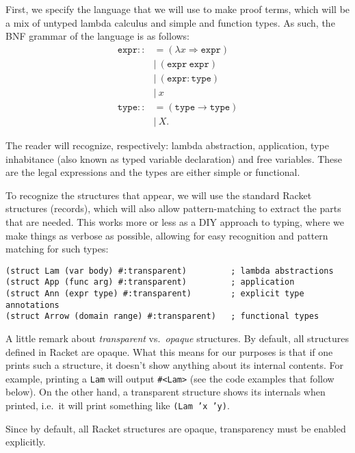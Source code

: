 First, we specify the language that we will use to make proof terms,
which will be a mix of untyped lambda calculus and simple and function
types. As such, the BNF grammar of the language is as follows:
\begin{align*}
  \texttt{expr} ::&= (\lambda x \Rightarrow \texttt{expr}) \\
                  &| \ (\texttt{expr} \ \texttt{expr}) \\
                  &| \ (\texttt{expr} : \texttt{type}) \\
                  &| \ x \\
  \texttt{type} ::&= (\texttt{type} \to \texttt{type}) \\
                  &| \ X.
\end{align*}

The reader will recognize, respectively: lambda abstraction, application,
type inhabitance (also known as typed variable declaration) and
free variables. These are the legal expressions and the types are
either simple or functional.

To recognize the structures that appear, we will use the standard
Racket structures (records), which will also allow pattern-matching to
extract the parts that are needed. This works more or less as a DIY
approach to typing, where we make things as verbose as possible, allowing
for easy recognition and pattern matching for such types:
{
  \small
\begin{verbatim}
(struct Lam (var body) #:transparent)         ; lambda abstractions
(struct App (func arg) #:transparent)         ; application
(struct Ann (expr type) #:transparent)        ; explicit type annotations
(struct Arrow (domain range) #:transparent)   ; functional types
\end{verbatim}
}

A little remark about \emph{transparent} vs.\ \emph{opaque} structures.
By default, all structures defined in Racket are opaque. What this means
for our purposes is that if one prints such a structure, it doesn't
show anything about its internal contents. For example, printing
a \texttt{Lam} will output \texttt{\#<Lam>} (see the code examples
that follow below). On the other hand, a transparent structure shows
its internals when printed, i.e.\ it will print something like
\texttt{(Lam 'x 'y)}.

Since by default, all Racket structures are opaque, transparency must
be enabled explicitly.

